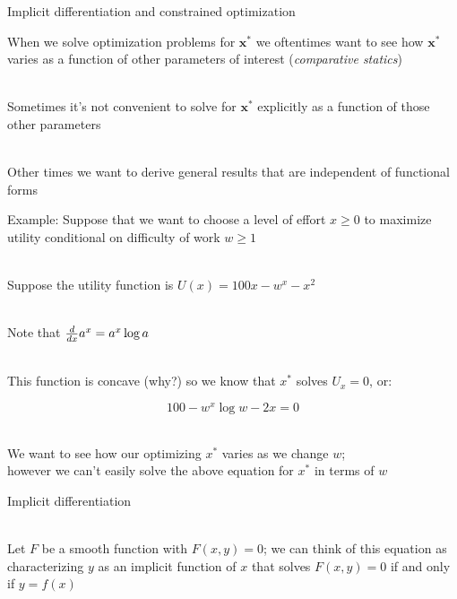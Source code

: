 \documentclass[10pt]{seminar}
\begin{document}
\newtheorem{proposition}{Proposition}

\newtheorem{definition}{Definition}

\newtheorem{corollary}{Corollary}

\newtheorem{theorem}{Theorem}

\newtheorem{lemma}{Lemma}

\def\argmax{\mathop{\rm argmax}\limits}  



\sffamily 


\begin{slide}
\begin{center}

Implicit differentiation and constrained optimization
 \end{center}
 
 \newslide
 \small 
 When we solve optimization problems for $\mathbf{x}^*$ we oftentimes want to see how $\mathbf{x}^*$ varies as a function of other parameters of interest (\textit{comparative statics})

\ \\Sometimes it's not convenient to solve for $\mathbf{x}^*$ explicitly as a function of those other parameters

\ \\Other times we want to derive general results that are independent of functional forms


\newslide

Example: Suppose that we want to choose a level of effort $x\geq 0$ to maximize utility conditional on difficulty of work  $w\geq 1$

\ \\Suppose the utility function is $U(x)=100x-w^x-x^2$

\ \\Note that ${d\over dx}a^x=a^x\log{a}$

\ \\This function is concave (why?) so we know that $x^*$ solves $U_x=0$, or:

$$100-w^x \log{w}-2 x=0$$

\ \\We want to see how our optimizing $x^*$ varies as we change $w$; \\however we can't easily solve the above equation  for $x^*$ in terms of $w$ 

\newslide
Implicit differentiation

\ \\Let $F$ be a smooth function with $F(x, y)=0$; we can think of this equation as characterizing $y$ as an implicit function of $x$  that solves $F(x, y)=0$ if and only if $y=f(x)$


\end{slide}
\end{document}
